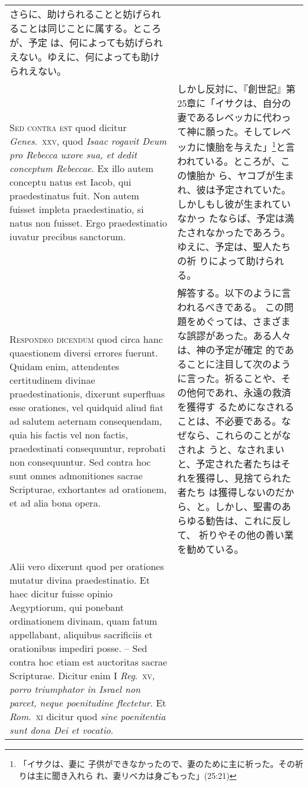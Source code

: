 \documentclass[10pt]{jsarticle} %
\begin{document}
\begin{longtable}{p{21em}p{21em}}
さらに、助けられることと妨げられることは同じことに属する。ところが、予定
 は、何によっても妨げられえない。ゆえに、何によっても助けられえない。

\\


{\scshape Sed contra est} quod dicitur {\itshape Genes}.~{\scshape xxv}, quod
{\itshape Isaac rogavit Deum pro Rebecca uxore sua, et dedit conceptum
Rebeccae}. Ex illo autem conceptu natus est Iacob, qui praedestinatus
fuit. Non autem fuisset impleta praedestinatio, si natus non
fuisset. Ergo praedestinatio iuvatur precibus sanctorum.


&


しかし反対に、『創世記』第25章に「イサクは、自分の妻であるレベッカに代わっ
 て神に願った。そしてレベッカに懐胎を与えた」\footnote{「イサクは、妻に
 子供ができなかったので、妻のために主に祈った。その祈りは主に聞き入れら
 れ、妻リベカは身ごもった」(25:21)}と言われている。ところが、この懐胎か
 ら、ヤコブが生まれ、彼は予定されていた。しかしもし彼が生まれていなかっ
 たならば、予定は満たされなかったであろう。ゆえに、予定は、聖人たちの祈
 りによって助けられる。

\\


{\scshape Respondeo dicendum} quod circa hanc quaestionem
diversi errores fuerunt. Quidam enim, attendentes certitudinem divinae
praedestinationis, dixerunt superfluas esse orationes, vel quidquid
aliud fiat ad salutem aeternam consequendam, quia his factis vel non
factis, praedestinati consequuntur, reprobati non consequuntur. Sed
contra hoc sunt omnes admonitiones sacrae Scripturae, exhortantes ad
orationem, et ad alia bona opera. 


&

解答する。以下のように言われるべきである。
この問題をめぐっては、さまざまな誤謬があった。ある人々は、神の予定が確定
 的であることに注目して次のように言った。祈ることや、その他何であれ、永遠の救済を獲得す
 るためになされることは、不必要である。なぜなら、これらのことがなされよ
 うと、なされまいと、予定された者たちはそれを獲得し、見捨てられた者たち
 は獲得しないのだから、と。しかし、聖書のあらゆる勧告は、これに反して、
 祈りやその他の善い業を勧めている。

\\

Alii vero dixerunt quod per orationes
mutatur divina praedestinatio. Et haec dicitur fuisse opinio
Aegyptiorum, qui ponebant ordinationem divinam, quam fatum appellabant,
aliquibus sacrificiis et orationibus impediri posse. -- Sed contra hoc
etiam est auctoritas sacrae Scripturae. Dicitur enim I {\itshape Reg}.~{\scshape xv}, {\itshape porro
triumphator in Israel non parcet, neque poenitudine flectetur}. Et
{\itshape Rom}.~{\scshape xi} dicitur quod {\itshape sine poenitentia
 sunt dona Dei et vocatio}. 


\end{longtable}
\end{document}
